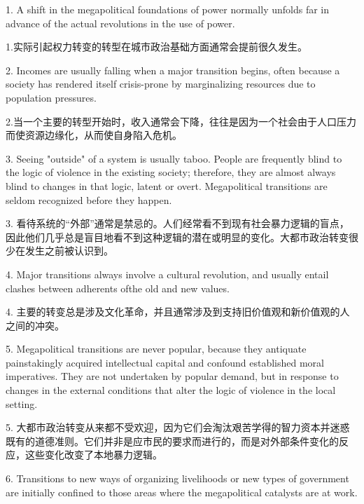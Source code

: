 \begin{Parallel}{97mm}{72mm}
  \ParallelLText
  {1. A shift in the megapolitical foundations of power normally unfolds far in advance of the actual revolutions in the use of power.}
  
  \ParallelRText
  {1.实际引起权力转变的转型在城市政治基础方面通常会提前很久发生。}
  \ParallelPar



  \ParallelLText
  {2. Incomes are usually falling when a major transition begins, often because a society has rendered itself crisis-prone by marginalizing resources due to population pressures.}
  
  \ParallelRText
  {2.当一个主要的转型开始时，收入通常会下降，往往是因为一个社会由于人口压力而使资源边缘化，从而使自身陷入危机。}
  \ParallelPar



  \ParallelLText
  {3. Seeing "outside" of a system is usually taboo. People are frequently blind to the logic of violence in the existing society; therefore, they are almost always blind to changes in that logic, latent or overt. Megapolitical transitions are seldom recognized before they happen.}
  
  \ParallelRText
  {3. 看待系统的“外部”通常是禁忌的。人们经常看不到现有社会暴力逻辑的盲点，因此他们几乎总是盲目地看不到这种逻辑的潜在或明显的变化。大都市政治转变很少在发生之前被认识到。}
  \ParallelPar



  \ParallelLText
  {4. Major transitions always involve a cultural revolution, and usually entail clashes between adherents ofthe old and new values.}
  
  \ParallelRText
  {4. 主要的转变总是涉及文化革命，并且通常涉及到支持旧价值观和新价值观的人之间的冲突。}
  \ParallelPar



  \ParallelLText
  {5. Megapolitical transitions are never popular, because they antiquate painstakingly acquired intellectual capital and confound established moral imperatives. They are not undertaken by popular demand, but in response to changes in the external conditions that alter the logic of violence in the local setting.}
  
  \ParallelRText
  {5. 大都市政治转变从来都不受欢迎，因为它们会淘汰艰苦学得的智力资本并迷惑既有的道德准则。它们并非是应市民的要求而进行的，而是对外部条件变化的反应，这些变化改变了本地暴力逻辑。}
  \ParallelPar



  \ParallelLText
  {6. Transitions to new ways of organizing livelihoods or new types of government are initially confined to those areas where the megapolitical catalysts are at work.}
  

\end{Parallel}
